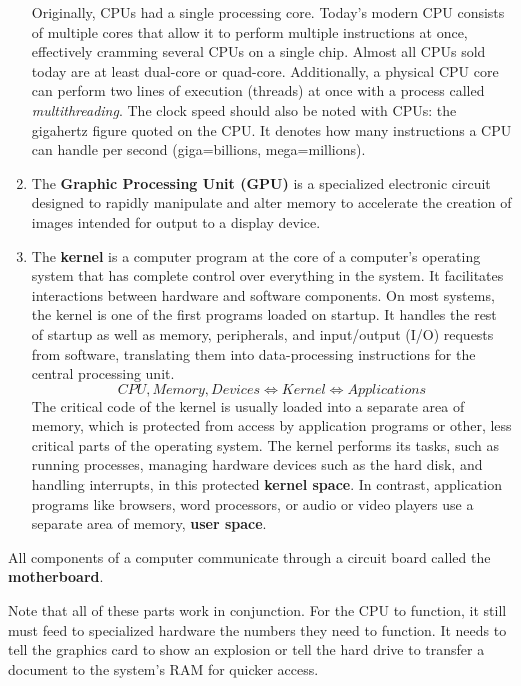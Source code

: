\documentclass{article}
\begin{document}
\begin{definition}
\begin{enumerate}
      Originally, CPUs had a single processing core. Today’s modern CPU consists of multiple cores that allow it to perform multiple instructions at once, effectively cramming several CPUs on a single chip. Almost all CPUs sold today are at least dual-core or quad-core. Additionally, a physical CPU core can perform two lines of execution (threads) at once with a process called \textit{multithreading}. The clock speed should also be noted with CPUs: the gigahertz figure quoted on the CPU. It denotes how many instructions a CPU can handle per second (giga=billions, mega=millions). 
      
      \item The \textbf{Graphic Processing Unit (GPU)} is a specialized electronic circuit designed to rapidly manipulate and alter memory to accelerate the creation of images intended for output to a display device. 
      
      \item The \textbf{kernel} is a computer program at the core of a computer's operating system that has complete control over everything in the system. It facilitates interactions between hardware and software components. On most systems, the kernel is one of the first programs loaded on startup. It handles the rest of startup as well as memory, peripherals, and input/output (I/O) requests from software, translating them into data-processing instructions for the central processing unit.
      \[CPU, Memory, Devices \iff Kernel \iff Applications\]
      The critical code of the kernel is usually loaded into a separate area of memory, which is protected from access by application programs or other, less critical parts of the operating system. The kernel performs its tasks, such as running processes, managing hardware devices such as the hard disk, and handling interrupts, in this protected \textbf{kernel space}. In contrast, application programs like browsers, word processors, or audio or video players use a separate area of memory, \textbf{user space}. 
  \end{enumerate}
  All components of a computer communicate through a circuit board called the \textbf{motherboard}. 
  \end{definition}

  Note that all of these parts work in conjunction. For the CPU to function, it still must feed to specialized hardware the numbers they need to function. It needs to tell the graphics card to show an explosion or tell the hard drive to transfer a document to the system’s RAM for quicker access.
\end{document}
